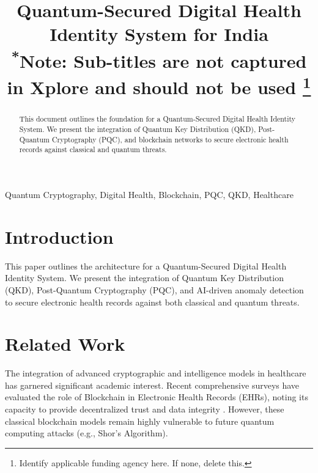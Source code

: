 \documentclass[conference]{IEEEtran}
\begin{document}
\title{Quantum-Secured Digital Health Identity System for India\\
{\footnotesize \textsuperscript{*}Note: Sub-titles are not captured in Xplore and should not be used}
\thanks{Identify applicable funding agency here. If none, delete this.}
}

\author{
\and
{}
}

\maketitle

\begin{abstract}
This document outlines the foundation for a Quantum-Secured Digital Health Identity System. We present the integration of Quantum Key Distribution (QKD), Post-Quantum Cryptography (PQC), and blockchain networks to secure electronic health records against classical and quantum threats.
\end{abstract}

\begin{IEEEkeywords}
Quantum Cryptography, Digital Health, Blockchain, PQC, QKD, Healthcare
\end{IEEEkeywords}

\section{Introduction}
This paper outlines the architecture for a Quantum-Secured Digital Health Identity System. We present the integration of Quantum Key Distribution (QKD), Post-Quantum Cryptography (PQC), and AI-driven anomaly detection to secure electronic health records against both classical and quantum threats.

\section{Related Work}
The integration of advanced cryptographic and intelligence models in healthcare has garnered significant academic interest. Recent comprehensive surveys have evaluated the role of Blockchain in Electronic Health Records (EHRs), noting its capacity to provide decentralized trust and data integrity \cite{blockchain_ehr_survey_2022}. However, these classical blockchain models remain highly vulnerable to future quantum computing attacks (e.g., Shor's Algorithm). 
\end{document}

